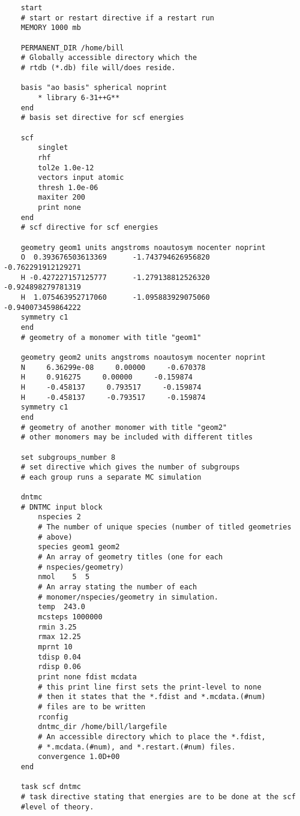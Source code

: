 \begin{verbatim}
    start
    # start or restart directive if a restart run
    MEMORY 1000 mb

    PERMANENT_DIR /home/bill
    # Globally accessible directory which the
    # rtdb (*.db) file will/does reside.

    basis "ao basis" spherical noprint
        * library 6-31++G**
    end
    # basis set directive for scf energies

    scf
        singlet
        rhf
        tol2e 1.0e-12
        vectors input atomic
        thresh 1.0e-06
        maxiter 200
        print none
    end
    # scf directive for scf energies

    geometry geom1 units angstroms noautosym nocenter noprint
    O  0.393676503613369      -1.743794626956820      -0.762291912129271
    H -0.427227157125777      -1.279138812526320      -0.924898279781319
    H  1.075463952717060      -1.095883929075060      -0.940073459864222
    symmetry c1
    end
    # geometry of a monomer with title "geom1"

    geometry geom2 units angstroms noautosym nocenter noprint
    N     6.36299e-08     0.00000     -0.670378
    H     0.916275     0.00000     -0.159874
    H     -0.458137     0.793517     -0.159874
    H     -0.458137     -0.793517     -0.159874
    symmetry c1
    end
    # geometry of another monomer with title "geom2"
    # other monomers may be included with different titles

    set subgroups_number 8
    # set directive which gives the number of subgroups
    # each group runs a separate MC simulation

    dntmc
    # DNTMC input block
        nspecies 2
        # The number of unique species (number of titled geometries
        # above)
        species geom1 geom2
        # An array of geometry titles (one for each
        # nspecies/geometry)
        nmol    5  5
        # An array stating the number of each
        # monomer/nspecies/geometry in simulation.
        temp  243.0
        mcsteps 1000000
        rmin 3.25
        rmax 12.25
        mprnt 10
        tdisp 0.04
        rdisp 0.06
        print none fdist mcdata
        # this print line first sets the print-level to none
        # then it states that the *.fdist and *.mcdata.(#num)
        # files are to be written
        rconfig
        dntmc_dir /home/bill/largefile
        # An accessible directory which to place the *.fdist,
        # *.mcdata.(#num), and *.restart.(#num) files.
        convergence 1.0D+00
    end

    task scf dntmc
    # task directive stating that energies are to be done at the scf
    #level of theory.
\end{verbatim}


